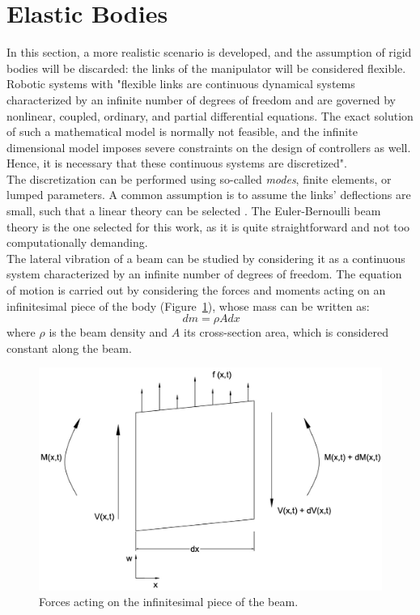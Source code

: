 \documentclass[a4paper,12pt,oneside]{report}
\begin{document}
\section{Elastic Bodies}
In this section, a more realistic scenario is developed, and the assumption of rigid bodies will be discarded: the links of the manipulator will be considered flexible.\\
Robotic systems with "flexible links are continuous dynamical systems characterized by an infinite number of degrees of freedom and are governed by nonlinear, coupled, ordinary, and partial differential equations. The exact solution of such a mathematical model is normally not feasible, and the infinite dimensional model imposes severe constraints on the design of controllers as well. Hence, it is necessary that these continuous systems are discretized"\cite{seventeen}. \\
The discretization can be performed using so-called \textit{modes}, finite elements, or lumped parameters. A common assumption is to assume the links' deflections are small, such that a linear theory can be selected \cite{seventeen,eighteen,twentyfive}. The Euler-Bernoulli beam theory is the one selected for this work, as it is quite straightforward and not too computationally demanding.\\
The lateral vibration of a beam can be studied by considering it as a continuous system characterized by an infinite number of degrees of freedom. The equation of motion is carried out by considering the forces and moments acting on an infinitesimal piece of the body (Figure~\ref{elementary}), whose mass can be written as:
\begin{equation}
\,dm=\rho Adx
\end{equation}
where $\rho$ is the beam density and $A$ its cross-section area, which is considered constant along the beam.\\
\begin{figure}[h]
\centering
\includegraphics[scale=0.25]{elementary}
\caption{Forces acting on the infinitesimal piece of the beam.}
\label{elementary}
\end{figure}
\end{document}
